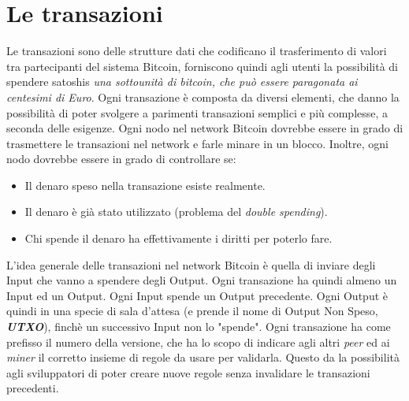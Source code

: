 \section{Le transazioni}
Le transazioni sono delle strutture dati che codificano il trasferimento di valori tra partecipanti del sistema Bitcoin, forniscono quindi agli utenti la possibilit\`a di spendere satoshis \textit{una sottounit\`a di bitcoin, che pu\`o essere paragonata ai centesimi di Euro}. Ogni transazione \`e composta da diversi elementi, che danno la possibilit\`a di poter svolgere a parimenti transazioni semplici e pi\`u complesse, a seconda delle esigenze.
Ogni nodo nel network Bitcoin dovrebbe essere in grado di trasmettere le transazioni nel network e farle minare in un blocco. 
Inoltre, ogni nodo dovrebbe essere in grado di controllare se:
\begin{itemize}
\item Il denaro speso nella transazione esiste realmente.
\item Il denaro \`e gi\`a stato utilizzato (problema del \textit{double spending}).
\item Chi spende il denaro ha effettivamente i diritti per poterlo fare.
\end{itemize}
L'idea generale delle transazioni nel network Bitcoin \`e quella di inviare degli Input che vanno a spendere degli Output. Ogni transazione ha quindi almeno un Input ed un Output. Ogni Input spende un Output precedente.
Ogni Output \`e quindi in una specie di sala d'attesa (e prende il nome di Output Non Speso, \textit{\textbf{UTXO}}), finch\`e un successivo Input non lo "spende".
Ogni transazione ha come prefisso il numero della versione, che ha lo scopo di indicare agli altri \textit{peer} ed ai \textit{miner} il corretto insieme di regole da usare per validarla. Questo da la possibilit\`a agli sviluppatori di poter creare nuove regole senza invalidare le transazioni precedenti.


